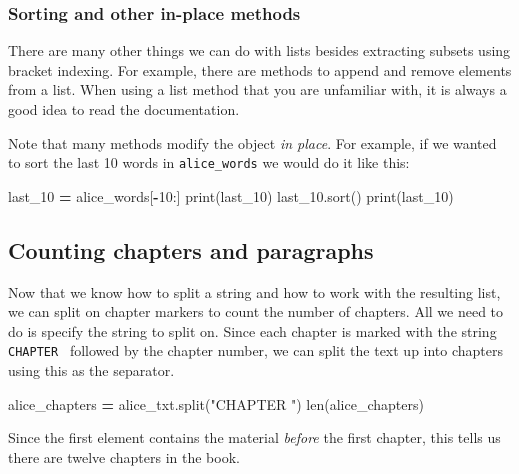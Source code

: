 \documentclass[]{book}
\newenvironment{Shaded}{\begin{snugshade}}{\end{snugshade}}
\newcommand{\DecValTok}[1]{\textcolor[rgb]{0.00,0.00,0.81}{#1}}
\newcommand{\StringTok}[1]{\textcolor[rgb]{0.31,0.60,0.02}{#1}}
\newcommand{\OperatorTok}[1]{\textcolor[rgb]{0.81,0.36,0.00}{\textbf{#1}}}
\newcommand{\BuiltInTok}[1]{#1}
\newcommand{\NormalTok}[1]{#1}
\begin{document}
\subsubsection{Sorting and other in-place
methods}\label{sorting-and-other-in-place-methods}

There are many other things we can do with lists besides extracting
subsets using bracket indexing. For example, there are methods to append
and remove elements from a list. When using a list method that you are
unfamiliar with, it is always a good idea to read the documentation.

Note that many methods modify the object \emph{in place}. For example,
if we wanted to sort the last 10 words in \texttt{alice\_words} we would
do it like this:

\begin{Shaded}
\begin{Highlighting}[]
\NormalTok{last_10 }\OperatorTok{=}\NormalTok{ alice_words[}\OperatorTok{-}\DecValTok{10}\NormalTok{:]}
\BuiltInTok{print}\NormalTok{(last_10)}
\NormalTok{last_10.sort()}
\BuiltInTok{print}\NormalTok{(last_10)}
\end{Highlighting}
\end{Shaded}

\subsection{Counting chapters and
paragraphs}\label{counting-chapters-and-paragraphs}

Now that we know how to split a string and how to work with the
resulting list, we can split on chapter markers to count the number of
chapters. All we need to do is specify the string to split on. Since
each chapter is marked with the string
\texttt{\textquotesingle{}CHAPTER\ \textquotesingle{}} followed by the
chapter number, we can split the text up into chapters using this as the
separator.

\begin{Shaded}
\begin{Highlighting}[]
\NormalTok{alice_chapters }\OperatorTok{=}\NormalTok{ alice_txt.split(}\StringTok{"CHAPTER "}\NormalTok{)}
\BuiltInTok{len}\NormalTok{(alice_chapters)}
\end{Highlighting}
\end{Shaded}

Since the first element contains the material \emph{before} the first
chapter, this tells us there are twelve chapters in the book.
\end{document}
